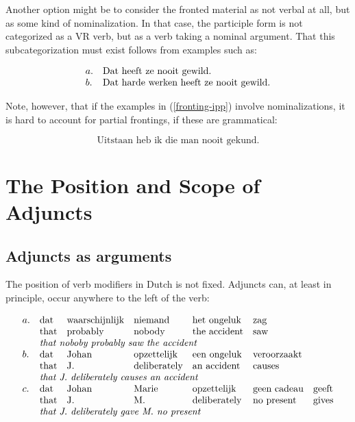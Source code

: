 Another option might be to consider the fronted material as not verbal at all, 
but as some kind of nominalization. In that case, the participle form is not 
categorized as a VR verb, but as a verb taking a nominal argument. That this 
subcategorization must exist follows from examples such as:

\begin{equation}
\begin{array}[t]{ll@{\hspace{0cm}}l}
a. && \mbox{Dat heeft ze nooit gewild.} \\
b. && \mbox{Dat harde werken heeft ze nooit gewild.}\\
\end{array}
\end{equation} 

Note, however, that if the examples in (\ref{fronting-ipp}) involve 
nominalizations, it is hard to account for partial frontings, if these are 
grammatical:

\begin{equation}
\mbox{Uitstaan heb ik die man nooit gekund.}
\end{equation} 


\section{The Position and Scope of Adjuncts}


\subsection{Adjuncts as arguments} 

The position of verb modifiers in Dutch is not fixed.  Adjuncts can, at least in
principle, occur anywhere to the left of the verb:

\begin{equation}
\label{adj-ex}
\begin{array}[t]{llllllll}
a. & \mbox{dat} & \mbox{waarschijnlijk} & \mbox{niemand} & \mbox{het ongeluk} & 
\mbox{zag}\\
& \mbox{that} & \mbox{probably} & \mbox{nobody} & \mbox{the accident} & 
\mbox{saw} 
\\
& \multicolumn{6}{l}{\mbox{\em that noboby probably saw the accident}} \\
b. & \mbox{dat} & \mbox{Johan} & \mbox{opzettelijk} & \mbox{een ongeluk} & 
\mbox{veroorzaakt}\\
& \mbox{that} & \mbox{J.} & \mbox{deliberately} & \mbox{an accident} & 
\mbox{causes} 
\\
& \multicolumn{6}{l}{\mbox{\em that J. deliberately causes an accident}} \\
c. & \mbox{dat} & \mbox{Johan} & \mbox{Marie} & \mbox{opzettelijk} & \mbox{geen 
cadeau} & \mbox{geeft} \\
& \mbox{that} & \mbox{J.} & \mbox{M.} & \mbox{deliberately} & \mbox{no present} 
& 
\mbox{gives} \\
& \multicolumn{6}{l}{\mbox{\em that J. deliberately gave M. no present}}
\end{array}
\end{equation}

